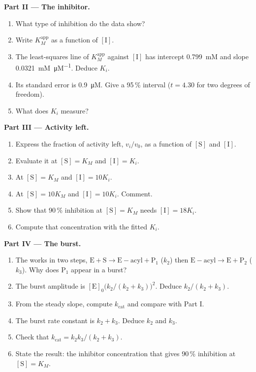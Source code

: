 \begin{problem}
\medskip\noindent\textbf{Part II --- The inhibitor.}
\begin{enumerate}[resume]
  \item What type of inhibition do the data show?
  \item Write $K_M^{\mathrm{app}}$ as a function of $[\mathrm I]$.
  \item The least-squares line of $K_M^{\mathrm{app}}$ against $[\mathrm I]$ has intercept \qty{0.799}{mM} and
        slope \qty{0.0321}{mM.\micro M^{-1}}. Deduce $K_i$.
  \item Its standard error is \qty{0.9}{\micro M}. Give a 95\,\% interval ($t = 4.30$ for
        two degrees of freedom).
  \item What does $K_i$ measure?
\end{enumerate}

\medskip\noindent\textbf{Part III --- Activity left.}
\begin{enumerate}[resume]
  \item Express the fraction of activity left, $v_i/v_0$, as a function of $[\mathrm S]$ and
        $[\mathrm I]$.
  \item Evaluate it at $[\mathrm S] = K_M$ and $[\mathrm I] = K_i$.
  \item At $[\mathrm S] = K_M$ and $[\mathrm I] = 10K_i$.
  \item At $[\mathrm S] = 10K_M$ and $[\mathrm I] = 10K_i$. Comment.
  \item Show that 90\,\% inhibition at $[\mathrm S] = K_M$ needs $[\mathrm I] = 18K_i$.
  \item Compute that concentration with the fitted $K_i$.
\end{enumerate}

\medskip\noindent\textbf{Part IV --- The burst.}
\begin{enumerate}[resume]
  \item The  works in two steps, $\mathrm{E + S \to E{-}acyl + P_1}$ ($k_2$) then $\mathrm{E{-}acyl \to E +
        P_2}$ ($k_3$). Why does $\mathrm P_1$ appear in a burst?
  \item The burst amplitude is $[\mathrm E]_0\bigl(k_2/(k_2 + k_3)\bigr)^2$. Deduce $k_2/(k_2 + k_3)$.
  \item From the steady slope, compute $k_{\mathrm{cat}}$ and compare with Part I.
  \item The burst rate constant is $k_2 + k_3$. Deduce $k_2$ and $k_3$.
  \item Check that $k_{\mathrm{cat}} = k_2k_3/(k_2 + k_3)$.
  \item State the result: the inhibitor concentration that gives 90\,\% inhibition at
        $[\mathrm S] = K_M$.
\end{enumerate}
\end{problem}
